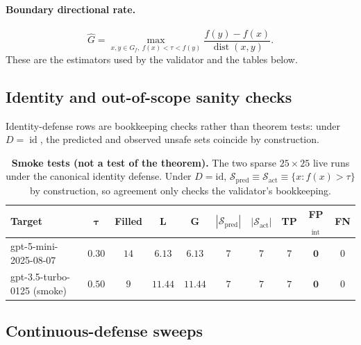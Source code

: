 \documentclass[11pt]{article}
\newcommand{\id}{\operatorname{id}}
\newcommand{\dist}{\operatorname{dist}}
\begin{document}
\paragraph{Boundary directional rate.}
\[
\hat G = \max_{x,y \in G_f,\ f(x)<\tau<f(y)}
\frac{f(y)-f(x)}{\dist(x,y)}.
\]
These are the estimators used by the validator and the tables below.

\subsection{Identity and out-of-scope sanity checks}
\label{sec:identity-sanity}

Identity-defense rows are bookkeeping checks rather than theorem tests:
under $D=\id$, the predicted and observed unsafe sets coincide by
construction.

\begin{table}[h]
\centering
\small
\caption{\textbf{Smoke tests (not a test of the theorem).} The two
sparse $25\times 25$ live runs under the canonical identity defense.
Under $D = \mathrm{id}$,
$\mathcal{S}_{\text{pred}} \equiv \mathcal{S}_{\text{act}} \equiv
\{x : f(x) > \tau\}$ by construction, so agreement only checks the
validator's bookkeeping.}
\label{tab:smoketests}
\begin{tabular}{lccccccccc}
\toprule
\textbf{Target} & $\boldsymbol{\tau}$ & \textbf{Filled} & $\boldsymbol{L}$ & $\boldsymbol{G}$ & $|\mathcal{S}_{\text{pred}}|$ & $|\mathcal{S}_{\text{act}}|$ & \textbf{TP} & \textbf{FP}$_{\text{int}}$ & \textbf{FN} \\
\midrule
gpt-5-mini-2025-08-07      & $0.30$ & $14$ & $6.13$  & $6.13$  & $7$ & $7$ & $7$ & $\mathbf{0}$ & $0$ \\
gpt-3.5-turbo-0125 (smoke) & $0.50$ & $9$  & $11.44$ & $11.44$ & $7$ & $7$ & $7$ & $\mathbf{0}$ & $0$ \\
\bottomrule
\end{tabular}
\end{table}

\subsection{Continuous-defense sweeps}
\label{app:continuous-sweeps}

\begin{table}[h]
\centering
\small
\caption{Continuous-defense sweep on the saturated
\texttt{gpt-3.5-turbo-0125} grid over continuous defense families
(GP-oblique, Gaussian-smoothed nearest-safe, contractive-flow).
Each row reports empirical $\hat\ell$, $\hat K$,
$|\mathcal{S}_{\text{pred}}|$, $|\mathcal{S}_{\text{act}}|$, TP, and
FP$_{\text{int}}$.}
\label{tab:continuous-sweep}

\end{table}
\end{document}
